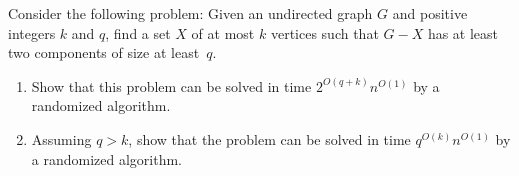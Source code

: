 \begin{exercise}[\hard]
Consider the following problem: Given an undirected graph $G$ and positive integers $k$ and $q$, find a set $X$ of at most $k$ vertices such that $G - X$ has at least two components of size at least~$q$.
\begin{enumerate}
\item Show that this problem can be solved in time $2^{O(q+k)}n^{O(1)}$ by a randomized algorithm.
\item Assuming $q>k$, show that the problem can be solved in time $q^{O(k)}n^{O(1)}$ by a randomized algorithm.
\end{enumerate}
\end{exercise}